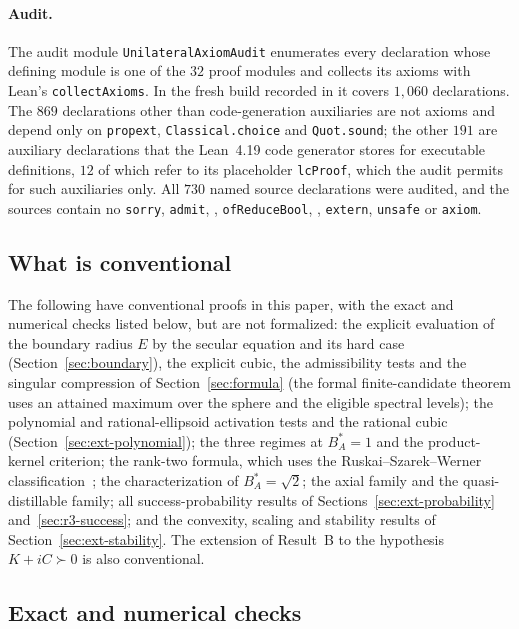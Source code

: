 \paragraph{Audit.} The audit module \texttt{UnilateralAxiomAudit}
enumerates every declaration whose defining module is one of the $32$
proof modules and collects its axioms with Lean's \texttt{collectAxioms}.
In the fresh build recorded in  it covers $1{,}060$
declarations. The $869$ declarations other than code-generation
auxiliaries are not axioms and depend only on \texttt{propext},
\texttt{Classical.choice} and \texttt{Quot.sound}; the other $191$ are
auxiliary declarations that the Lean~4.19 code generator stores for
executable definitions, $12$ of which refer to its placeholder
\texttt{lcProof}, which the audit permits for such auxiliaries only. All
$730$ named source declarations were audited, and the sources contain no
\texttt{sorry}, \texttt{admit}, ,
\texttt{ofReduceBool}, , \texttt{extern},
\texttt{unsafe} or \texttt{axiom}.

\subsection{What is conventional}

The following have conventional proofs in this paper, with the exact and
numerical checks listed below, but are not formalized: the explicit
evaluation of the boundary radius $E$ by the secular equation and its hard
case (Section~\ref{sec:boundary}), the explicit cubic, the admissibility
tests and the singular compression of Section~\ref{sec:formula} (the formal
finite-candidate theorem uses an attained maximum over the sphere and the
eligible spectral levels); the polynomial and rational-ellipsoid
activation tests and the rational cubic (Section~\ref{sec:ext-polynomial});
the three regimes at $B_A^*=1$ and the product-kernel criterion; the
rank-two formula, which uses the Ruskai--Szarek--Werner
classification~\cite{ruskai2002}; the characterization of $B_A^*=\sqrt2$;
the axial family and the quasi-distillable family; all success-probability
results of Sections~\ref{sec:ext-probability} and~\ref{sec:r3-success};
and the convexity, scaling and stability results of
Section~\ref{sec:ext-stability}. The extension of Result~B to the
hypothesis $K+iC\succ0$ is also conventional.

\subsection{Exact and numerical checks}

